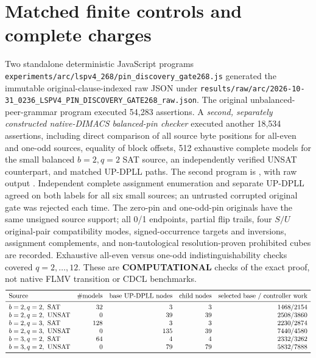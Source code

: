 \documentclass[11pt]{article}
\begin{document}
\section{Matched finite controls and complete charges}
Two standalone deterministic JavaScript programs \texttt{experiments/arc/lspv4\_268/pin\_discovery\_gate268.js} generated the immutable original-clause-indexed raw JSON under \texttt{results/raw/arc/2026-10-31\_0236\_LSPV4\_PIN\_DISCOVERY\_GATE268\_raw.json}. The original unbalanced-peer-grammar program executed 54,283 assertions. A \emph{second, separately constructed native-DIMACS balanced-pin checker} executed another 18,534 assertions, including direct comparison of all source byte positions for all-even and one-odd sources, equality of block offsets, 512 exhaustive complete models for the small balanced $b=2,q=2$ SAT source, an independently verified UNSAT counterpart, and matched UP-DPLL paths. The second program is , with raw output . Independent complete assignment enumeration and separate UP-DPLL agreed on both labels for all six small sources; an untrusted corrupted original gate was rejected each time. The zero-pin and one-odd-pin originals have the same unsigned source support; all 0/1 endpoints, partial flip trails, four $S/U$ original-pair compatibility modes, signed-occurrence targets and inversions, assignment complements, and non-tautological resolution-proven prohibited cubes are recorded. Exhaustive all-even versus one-odd indistinguishability checks covered $q=2,\ldots,12$. These are \textbf{COMPUTATIONAL} checks of the exact proof, not native FLMV transition or CDCL benchmarks.
\[
\begin{array}{lrrrr}
\toprule
\text{Source}&\#\mathrm{models}&\text{base UP-DPLL nodes}&\text{child nodes}&
\text{selected base / controller work}\\\midrule
b=2,q=2,\ \mathrm{SAT}&32&3&3&1468/2154\\
b=2,q=2,\ \mathrm{UNSAT}&0&39&39&2508/3860\\
b=2,q=3,\ \mathrm{SAT}&128&3&3&2230/2874\\
b=2,q=3,\ \mathrm{UNSAT}&0&135&39&7440/4580\\
b=3,q=2,\ \mathrm{SAT}&64&4&4&2332/3262\\
b=3,q=2,\ \mathrm{UNSAT}&0&79&79&5832/7888\\\bottomrule
\end{array}
\]
\end{document}
